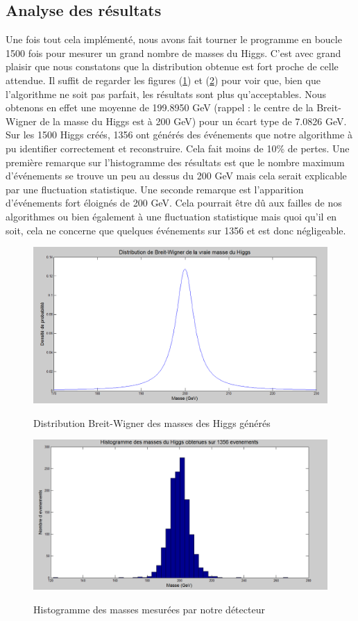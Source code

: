 \documentclass[11pt]{article}
\begin{document}
\newpage
\subsection{Analyse des résultats}

Une fois tout cela implémenté, nous avons fait tourner le programme en boucle
1500 fois pour mesurer un grand nombre de masses du Higgs. C'est avec grand
plaisir que nous constatons que la distribution obtenue est fort proche de celle
attendue. Il suffit de regarder les figures (\ref{bw}) et (\ref{hist}) pour voir
que, bien que l'algorithme ne soit pas parfait, les résultats sont plus
qu'acceptables. Nous obtenons en effet une moyenne de 199.8950 GeV (rappel : le
centre de la Breit-Wigner de la masse du Higgs est à 200 GeV) pour un
écart type de 7.0826 GeV. Sur les 1500 Higgs créés, 1356 ont générés des
événements que notre algorithme à pu identifier correctement et reconstruire.
Cela fait moins de 10\% de pertes. Une première remarque sur l'histogramme des
résultats est que le nombre maximum d'événements se trouve un peu au dessus du
200 GeV mais cela serait explicable par une fluctuation statistique. Une seconde
remarque est l'apparition d'événements fort éloignés de 200 GeV. Cela pourrait
être dû aux failles de nos algorithmes ou bien également à une fluctuation
statistique mais quoi qu'il en soit, cela ne concerne que quelques événements
sur 1356 et est donc négligeable.

\begin{figure}[h!]
\caption{Distribution Breit-Wigner des masses des Higgs générés}
\includegraphics[scale=0.4]{images/bwmH.png}
\label{bw}
\end{figure}

\begin{figure}
\caption{Histogramme des masses mesurées par notre détecteur}
\includegraphics[scale=0.4]{images/histmH.png}
\label{hist}
\end{figure}
\end{document}
